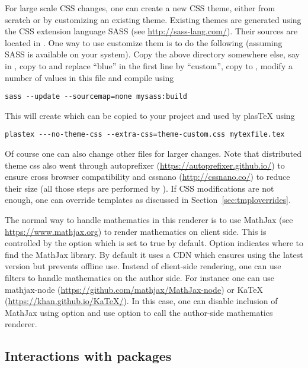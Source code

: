 For large scale CSS changes, one can create a new
CSS theme, either from scratch or by customizing an existing theme.
Existing themes are generated using the CSS extension language SASS (see
\url{http://sass-lang.com/}). Their sources are located in
. One way to use customize
them is to do the following (assuming SASS is available on your system).
Copy the above directory somewhere else, say in , copy
 to  and replace ``blue''
in the first line by ``custom'', copy  to
, modify a number of values in this file
and compile using
\begin{verbatim}
sass --update --sourcemap=none mysass:build
\end{verbatim}
This will create  which can be copied to
your project and used by plasTeX using
\begin{verbatim}
plastex ---no-theme-css --extra-css=theme-custom.css mytexfile.tex
\end{verbatim}
Of course one can also change other  files for larger
changes. Note that distributed theme css also went through autoprefixer
(\url{https://autoprefixer.github.io/}) to ensure cross browser
compatibility and cssnano (\url{http://cssnano.co/}) to reduce their
size (all those steps are performed by
). If CSS
modifications are not enough, one can override templates as discussed in
Section~\ref{sec:tmploverrides}.

The normal way to handle mathematics in this renderer is to use MathJax
(see \url{https://www.mathjax.org}) to render mathematics on client side. 
This is controlled by the  option which is
set to true by default. Option  indicates
where to find the MathJax library. By default it uses a CDN which
ensures using the latest version but prevents offline use.
Instead of client-side rendering, one can use filters to handle
mathematics on the author side. For instance one can use mathjax-node
(\url{https://github.com/mathjax/MathJax-node}) or KaTeX
(\url{https://khan.github.io/KaTeX/}). In this case, one can disable
inclusion of MathJax using option  and
use option  to call the author-side
mathematics renderer.

\subsection{Interactions with packages}\label{sec:html5-pkg}

